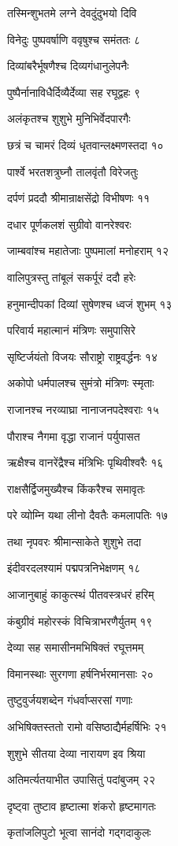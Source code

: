 तस्मिन्शुभतमे लग्ने देवदुंदुभयो दिवि

विनेदुः पुष्पवर्षाणि ववृषुश्च समंततः ८

दिव्यांबरैर्भूषणैश्च दिव्यगंधानुलेपनैः

पुष्पैर्नानाविधैर्दिव्यैर्देव्या सह रघूद्वहः ९

अलंकृतश्च शुशुभे मुनिभिर्वेदपारगैः

छत्रं च चामरं दिव्यं धृतवान्लक्ष्मणस्तदा १०

पार्श्वे भरतशत्रुघ्नौ तालवृंतौ विरेजतुः

दर्पणं प्रददौ श्रीमान्राक्षसेंद्रो विभीषणः ११

दधार पूर्णकलशं सुग्रीवो वानरेश्वरः

जाम्बवांश्च महातेजाः पुष्पमालां मनोहराम् १२

वालिपुत्रस्तु तांबूलं सकर्पूरं ददौ हरेः

हनुमान्दीपकां दिव्यां सुषेणश्च ध्वजं शुभम् १३

परिवार्य महात्मानं मंत्रिणः समुपासिरे

सृष्टिर्जयंतो विजयः सौराष्ट्रो राष्ट्रवर्द्धनः १४

अकोपो धर्मपालश्च सुमंत्रो मंत्रिणः स्मृताः

राजानश्च नरव्याघ्रा नानाजनपदेश्वराः १५

पौराश्च नैगमा वृद्धा राजानं पर्युपासत

ऋक्षैश्च वानरेंद्रैश्च मंत्रिभिः पृथिवीश्वरैः १६

राक्षसैर्द्विजमुख्यैश्च किंकरैश्च समावृतः

परे व्योम्नि यथा लीनो दैवतैः कमलापतिः १७

तथा नृपवरः श्रीमान्साकेते शुशुभे तदा

इंदीवरदलश्यामं पद्मपत्रनिभेक्षणम् १८

आजानुबाहुं काकुत्स्थं पीतवस्त्रधरं हरिम्

कंबुग्रीवं महोरस्कं विचित्राभरणैर्युतम् १९

देव्या सह समासीनमभिषिक्तं रघूत्तमम्

विमानस्थाः सुरगणा हर्षनिर्भरमानसाः २०

तुष्टुवुर्जयशब्देन गंधर्वाप्सरसां गणाः

अभिषिक्तस्ततो रामो वसिष्ठाद्यैर्महर्षिभिः २१

शुशुभे सीतया देव्या नारायण इव श्रिया

अतिमर्त्यतयाभीत उपासितुं पदांबुजम् २२

दृष्ट्वा तुष्टाव हृष्टात्मा शंकरो हृष्टमागतः

कृतांजलिपुटो भूत्वा सानंदो गद्गदाकुलः

